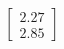 \documentclass[preview]{standalone}
\begin{document}
\begin{align*}
\begin{bmatrix} 2.27 \\ 2.85 \end{bmatrix}
\end{align*}
\end{document}
